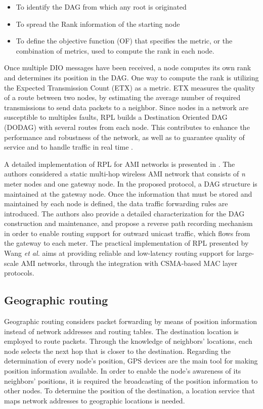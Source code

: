 \documentclass[11pt,draftclsnofoot,onecolumn]{IEEEtran}
\begin{document}
\begin{itemize}
	\item To identify the DAG from which any root is originated
	\item To spread the Rank information of the starting node
	\item To define the objective function (OF) that specifies the metric, or the combination of metrics, used to compute the rank in each node.
\end{itemize}

Once multiple DIO messages have been received, a node computes its own rank and determines its position in the DAG. One way to compute the rank is utilizing the Expected Transmission Count (ETX) as a metric. ETX measures the quality of a route between two nodes, by estimating the average number of required transmissions to send data packets to a neighbor. Since nodes in a network are susceptible to multiples faults, RPL builds a Destination Oriented DAG (DODAG) with several routes from each node. This contributes to enhance the performance and robustness of the network, as well as to guarantee quality of service and to handle traffic in real time  \cite{Pavkovic2011}.

A detailed implementation of RPL for AMI networks is presented in \cite{Wang2010}. The authors considered a static multi-hop wireless AMI network that consists of \textit{n} meter nodes and one gateway node. In the proposed protocol, a DAG structure is maintained at the gateway node. Once the information that must be stored and maintained by each node is defined, the data traffic forwarding rules are introduced. The authors also provide a detailed characterization for the DAG construction and maintenance, and propose a reverse path recording mechanism in order to enable routing support for outward unicast traffic, which flows from the gateway to each meter. The practical implementation of RPL presented by Wang \textit{et al.} aims at providing reliable and low-latency routing support for large-scale AMI networks, through the integration with CSMA-based MAC layer protocols. 

\subsection{Geographic routing}\label{geographic}

Geographic routing considers packet forwarding by means of position information instead of network addresses and routing tables. The destination location is employed to route packets. Through the knowledge of neighbors' locations, each node selects the next hop that is closer to the destination. Regarding the determination of every node's position, GPS devices are the main tool for making position information available. In order to enable the node's awareness of its neighbors' positions, it is required the broadcasting of the position information to other nodes. To determine the position of the destination, a location service that maps network addresses to geographic locations is needed. 
\end{document}
